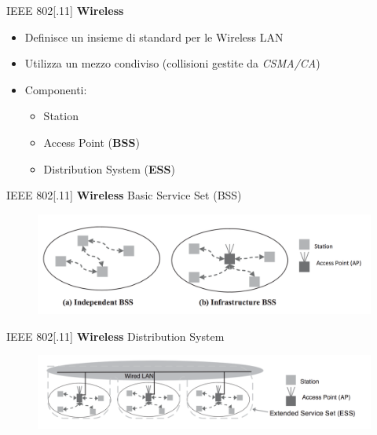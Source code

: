 \begin{frame}{IEEE 802[.11]}
	\textbf{Wireless}
	\begin{itemize}[<+- | alert@+>]
		\item Definisce un insieme di standard per le Wireless LAN
		\item Utilizza un mezzo condiviso (collisioni gestite da \textit{CSMA/CA})
		\item Componenti:
			\begin{itemize}
				\item Station
				\item Access Point (\textbf{BSS}) 
				\item Distribution System (\textbf{ESS})
			\end{itemize}
	\end{itemize}
\end{frame}
\begin{frame}{IEEE 802[.11]}
	\textbf{Wireless}
	\newline
	Basic Service Set (BSS)
		\begin{figure}[h] 
			\includegraphics[scale=0.3,cfbox=blue_slides 1pt 0pt]{imgs/bss.png}
		\end{figure}
	\end{frame}
	\begin{frame}{IEEE 802[.11]}
	\textbf{Wireless}
	\newline
	Distribution System
		\begin{figure}[h] 
			\includegraphics[scale=0.3,cfbox=blue_slides 1pt 0pt]{imgs/ds.png} %
		\end{figure}
\end{frame}
	
